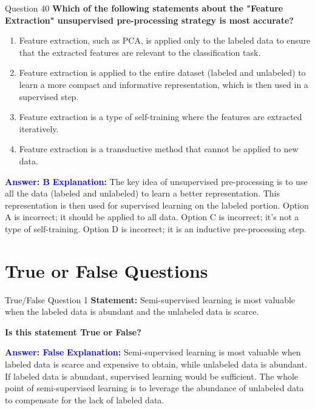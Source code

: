 \documentclass[8pt]{beamer}  %
\begin{document}
	\begin{frame}{Question 40}
		\textbf{Which of the following statements about the "Feature Extraction" unsupervised pre-processing strategy is most accurate?}
		\begin{enumerate}
			\item Feature extraction, such as PCA, is applied only to the labeled data to ensure that the extracted features are relevant to the classification task.
			\item Feature extraction is applied to the entire dataset (labeled and unlabeled) to learn a more compact and informative representation, which is then used in a supervised step.
			\item Feature extraction is a type of self-training where the features are extracted iteratively.
			\item Feature extraction is a transductive method that cannot be applied to new data.
		\end{enumerate}
		\vspace{0.2cm}
		\textcolor{blue}{\textbf{Answer: B}}
		\vspace{0.2cm}
		\textcolor{blue}{\textbf{Explanation:}} The key idea of unsupervised pre-processing is to use all the data (labeled and unlabeled) to learn a better representation. This representation is then used for supervised learning on the labeled portion. Option A is incorrect; it should be applied to all data. Option C is incorrect; it's not a type of self-training. Option D is incorrect; it is an inductive pre-processing step.
	\end{frame}
	
	\section{True or False Questions}
	
	\begin{frame}{True/False Question 1}
		\textbf{Statement:} Semi-supervised learning is most valuable when the labeled data is abundant and the unlabeled data is scarce.
		
		\vspace{0.3cm}
		\textbf{Is this statement True or False?}
		
		\vspace{0.2cm}
		\textcolor{blue}{\textbf{Answer: False}}
		\vspace{0.2cm}
		\textcolor{blue}{\textbf{Explanation:}} Semi-supervised learning is most valuable when labeled data is scarce and expensive to obtain, while unlabeled data is abundant. If labeled data is abundant, supervised learning would be sufficient. The whole point of semi-supervised learning is to leverage the abundance of unlabeled data to compensate for the lack of labeled data.
	\end{frame}
	
\end{document}
